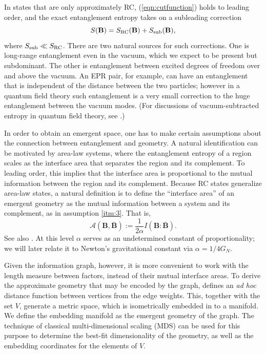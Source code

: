 \documentclass[%
preprint,
nofootinbib,
amsmath,amssymb,
aps,
prd,
showpacs,
superscriptaddress
]{revtex4-1}
\newcommand{\area}{\mathcal{A}}
\DeclareMathOperator{\co}{:}
\begin{document}
In states that are only approximately RC, (\ref{eqn:cutfunction}) holds to leading order, and the exact entanglement entropy takes on a subleading correction
\begin{equation}
 S(\textbf{B})=S_{\rm RC}(\textbf{B})+ S_{\rm sub}(\textbf{B}),
\end{equation}
where $S_{\rm sub}\ll S_{\rm RC}$. 
There are two natural sources for such corrections.
One is long-range entanglement even in the vacuum, which we expect to be present but subdominant.
The other is entanglement between excited degrees of freedom over and above the vacuum.
An EPR pair, for example, can have an entanglement that is independent of the distance between the two particles; however in a quantum field theory such entanglement is a very small correction to the huge entanglement between the vacuum modes.
(For discussions of vacuum-subtracted entropy in quantum field theory, see \cite{Casini:2008cr,Bousso:2014sda,Bousso:2014uxa}.)

In order to obtain an emergent space, one has to make certain assumptions about the connection between entanglement and geometry. A natural identification can be motivated by area-law systems, where the entanglement entropy of a region scales as the interface area that separates the region and its complement. To leading order, this implies that the interface area is proportional to the mutual information between the region and its complement. Because RC states generalize area-law states, a natural definition is to define the ``interface area'' of an emergent geometry as the mutual information between a system and its complement, as in assumption \ref{itm:3}.
That is,
\begin{equation}
 \area(\textbf{B}, \bar{\textbf{B}}):=\frac{1}{2\alpha} I(\textbf{B}\co \bar{\textbf{B}}).
\end{equation}
See also \cite{Bianchi:2012ev,Myers:2013lva}.
At this level $\alpha$ serves as an undetermined constant of proportionality; we will later relate it to Newton's gravitational constant via $\alpha = 1/4G_N$.

Given the information graph, however, it is more convenient to work with the length measure between factors, instead of their mutual interface areas.
To derive the approximate geometry that may be encoded by the graph, \cite{Cao:2016mst} defines an \textit{ad hoc} distance function between vertices from the edge weights. This, together with the set $V$, generate a metric space, which is isometrically embedded in to a manifold. We define the embedding manifold as the emergent geometry of the graph. The technique of classical multi-dimensional scaling (MDS) \cite{cmds,walter,eladkimmel,gmds,mdsbook} can be used for this purpose to determine the best-fit dimensionality of the geometry, as well as the embedding coordinates for the elements of $V$.
\end{document}

